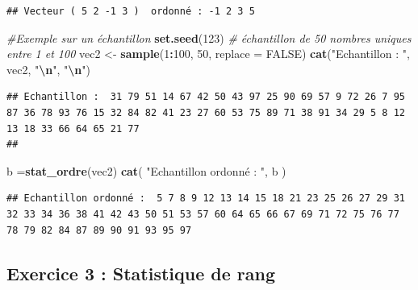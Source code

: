 \documentclass[
  12pt,
]{article}
\newenvironment{Shaded}{\begin{snugshade}}{\end{snugshade}}
\newcommand{\AttributeTok}[1]{\textcolor[rgb]{0.13,0.29,0.53}{#1}}
\newcommand{\CommentTok}[1]{\textcolor[rgb]{0.56,0.35,0.01}{\textit{#1}}}
\newcommand{\ConstantTok}[1]{\textcolor[rgb]{0.56,0.35,0.01}{#1}}
\newcommand{\DecValTok}[1]{\textcolor[rgb]{0.00,0.00,0.81}{#1}}
\newcommand{\FunctionTok}[1]{\textcolor[rgb]{0.13,0.29,0.53}{\textbf{#1}}}
\newcommand{\NormalTok}[1]{#1}
\newcommand{\OtherTok}[1]{\textcolor[rgb]{0.56,0.35,0.01}{#1}}
\newcommand{\SpecialCharTok}[1]{\textcolor[rgb]{0.81,0.36,0.00}{\textbf{#1}}}
\newcommand{\StringTok}[1]{\textcolor[rgb]{0.31,0.60,0.02}{#1}}
\begin{document}
\begin{verbatim}
## Vecteur ( 5 2 -1 3 )  ordonné : -1 2 3 5
\end{verbatim}

\begin{Shaded}
\begin{Highlighting}[]
\CommentTok{\#Exemple sur un échantillon }
\FunctionTok{set.seed}\NormalTok{(}\DecValTok{123}\NormalTok{) }
\CommentTok{\# échantillon de 50 nombres uniques entre 1 et 100}
\NormalTok{vec2 }\OtherTok{\textless{}{-}} \FunctionTok{sample}\NormalTok{(}\DecValTok{1}\SpecialCharTok{:}\DecValTok{100}\NormalTok{, }\DecValTok{50}\NormalTok{, }\AttributeTok{replace =} \ConstantTok{FALSE}\NormalTok{)  }
\FunctionTok{cat}\NormalTok{(}\StringTok{"Echantillon : "}\NormalTok{, vec2, }\StringTok{"}\SpecialCharTok{\textbackslash{}n}\StringTok{"}\NormalTok{, }\StringTok{"}\SpecialCharTok{\textbackslash{}n}\StringTok{"}\NormalTok{)}
\end{Highlighting}
\end{Shaded}

\begin{verbatim}
## Echantillon :  31 79 51 14 67 42 50 43 97 25 90 69 57 9 72 26 7 95 87 36 78 93 76 15 32 84 82 41 23 27 60 53 75 89 71 38 91 34 29 5 8 12 13 18 33 66 64 65 21 77 
## 
\end{verbatim}

\begin{Shaded}
\begin{Highlighting}[]
\NormalTok{b }\OtherTok{=}\FunctionTok{stat\_ordre}\NormalTok{(vec2)}
\FunctionTok{cat}\NormalTok{( }\StringTok{"Echantillon ordonné : "}\NormalTok{, b )}
\end{Highlighting}
\end{Shaded}

\begin{verbatim}
## Echantillon ordonné :  5 7 8 9 12 13 14 15 18 21 23 25 26 27 29 31 32 33 34 36 38 41 42 43 50 51 53 57 60 64 65 66 67 69 71 72 75 76 77 78 79 82 84 87 89 90 91 93 95 97
\end{verbatim}

\subsection{Exercice 3 : Statistique de
rang}\label{exercice-3-statistique-de-rang}
\end{document}
